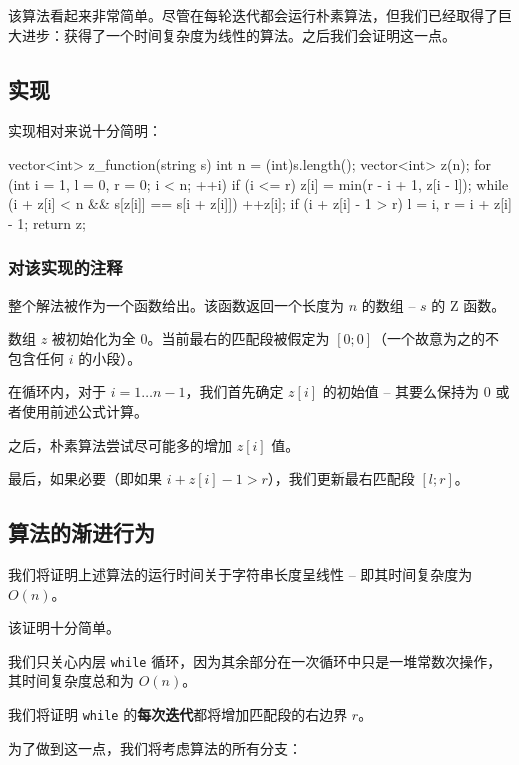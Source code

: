 该算法看起来非常简单。尽管在每轮迭代都会运行朴素算法，但我们已经取得了巨大进步：获得了一个时间复杂度为线性的算法。之后我们会证明这一点。

\subsection{实现}

实现相对来说十分简明：

\begin{cppcode}
vector<int> z_function(string s) {
  int n = (int)s.length();
  vector<int> z(n);
  for (int i = 1, l = 0, r = 0; i < n; ++i) {
    if (i <= r) z[i] = min(r - i + 1, z[i - l]);
    while (i + z[i] < n && s[z[i]] == s[i + z[i]]) ++z[i];
    if (i + z[i] - 1 > r) l = i, r = i + z[i] - 1;
  }
  return z;
}
\end{cppcode}

\subsubsection{对该实现的注释}

整个解法被作为一个函数给出。该函数返回一个长度为 $n$ 的数组 -- $s$ 的 Z 函数。

数组 $z$ 被初始化为全 $0$。当前最右的匹配段被假定为 $[0;0]$（一个故意为之的不包含任何 $i$ 的小段）。

在循环内，对于 $i=1\dots n - 1$，我们首先确定 $z[i]$ 的初始值 -- 其要么保持为 $0$ 或者使用前述公式计算。

之后，朴素算法尝试尽可能多的增加 $z[i]$ 值。

最后，如果必要（即如果 $i + z[i] - 1 > r$），我们更新最右匹配段 $[l;r]$。

\subsection{算法的渐进行为}

我们将证明上述算法的运行时间关于字符串长度呈线性 -- 即其时间复杂度为 $O(n)$。

该证明十分简单。

我们只关心内层 \texttt{while} 循环，因为其余部分在一次循环中只是一堆常数次操作，其时间复杂度总和为 $O(n)$。

我们将证明 \texttt{while} 的\textbf{每次迭代}都将增加匹配段的右边界 $r$。

为了做到这一点，我们将考虑算法的所有分支：

